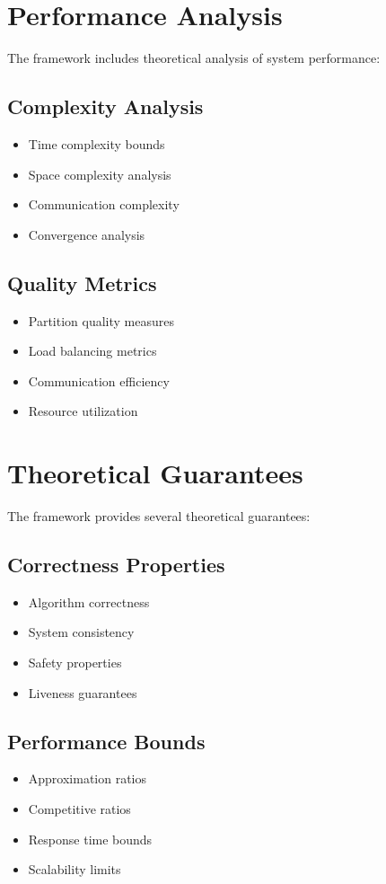 \section{Performance Analysis}
The framework includes theoretical analysis of system performance:

\subsection{Complexity Analysis}
\begin{itemize}
    \item Time complexity bounds
    \item Space complexity analysis
    \item Communication complexity
    \item Convergence analysis
\end{itemize}

\subsection{Quality Metrics}
\begin{itemize}
    \item Partition quality measures
    \item Load balancing metrics
    \item Communication efficiency
    \item Resource utilization
\end{itemize}

\section{Theoretical Guarantees}
The framework provides several theoretical guarantees:

\subsection{Correctness Properties}
\begin{itemize}
    \item Algorithm correctness
    \item System consistency
    \item Safety properties
    \item Liveness guarantees
\end{itemize}

\subsection{Performance Bounds}
\begin{itemize}
    \item Approximation ratios
    \item Competitive ratios
    \item Response time bounds
    \item Scalability limits
\end{itemize}


